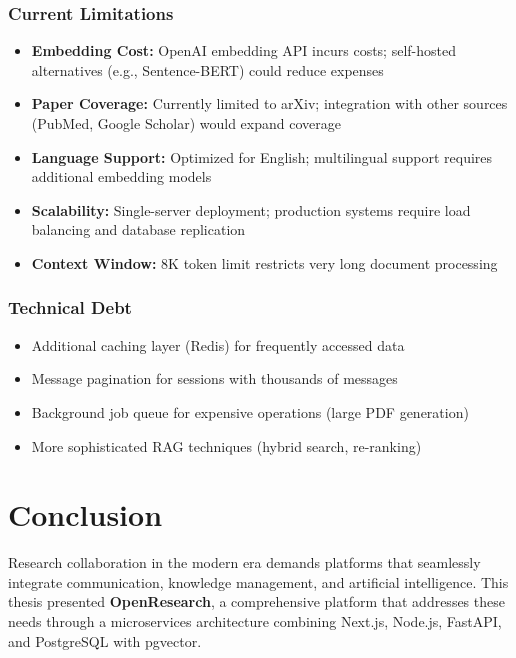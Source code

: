 \documentclass[12pt]{report}
\begin{document}
\subsection{Current Limitations}

\begin{itemize}
    \item \textbf{Embedding Cost:} OpenAI embedding API incurs costs; self-hosted alternatives (e.g., Sentence-BERT) could reduce expenses
    \item \textbf{Paper Coverage:} Currently limited to arXiv; integration with other sources (PubMed, Google Scholar) would expand coverage
    \item \textbf{Language Support:} Optimized for English; multilingual support requires additional embedding models
    \item \textbf{Scalability:} Single-server deployment; production systems require load balancing and database replication
    \item \textbf{Context Window:} 8K token limit restricts very long document processing
\end{itemize}

\subsection{Technical Debt}

\begin{itemize}
    \item Additional caching layer (Redis) for frequently accessed data
    \item Message pagination for sessions with thousands of messages
    \item Background job queue for expensive operations (large PDF generation)
    \item More sophisticated RAG techniques (hybrid search, re-ranking)
\end{itemize}

\chapter{Conclusion}

Research collaboration in the modern era demands platforms that seamlessly integrate communication, knowledge management, and artificial intelligence. This thesis presented \textbf{OpenResearch}, a comprehensive platform that addresses these needs through a microservices architecture combining Next.js, Node.js, FastAPI, and PostgreSQL with pgvector.
\end{document}
